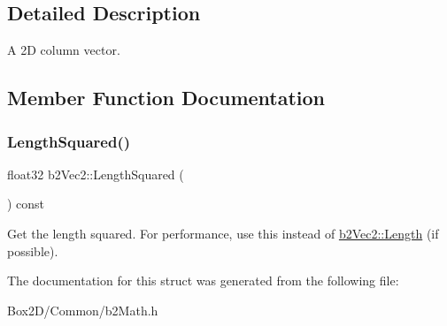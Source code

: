 \subsection{Detailed Description}
A 2D column vector. 

\subsection{Member Function Documentation}
\mbox{\label{structb2_vec2_af8a081dac7eea7800fdbfbf95ac9e395}} 
\subsubsection{\texorpdfstring{Length\+Squared()}{LengthSquared()}}
{\footnotesize\ttfamily float32 b2\+Vec2\+::\+Length\+Squared (\begin{DoxyParamCaption}{ }\end{DoxyParamCaption}) const\hspace{0.3cm}{\ttfamily [inline]}}

Get the length squared. For performance, use this instead of \hyperlink{structb2_vec2_a04cb9ac9e845a59f4212b2d7149fa3d9}{b2\+Vec2\+::\+Length} (if possible). 

The documentation for this struct was generated from the following file\+:\begin{DoxyCompactItemize}
\item 
Box2\+D/\+Common/b2\+Math.\+h\end{DoxyCompactItemize}
